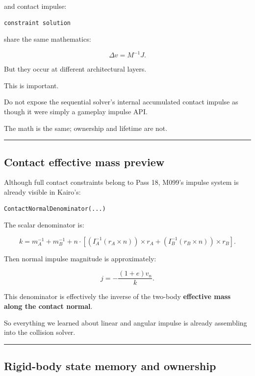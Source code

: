 and contact impulse:

\begin{verbatim}
constraint solution
\end{verbatim}

share the same mathematics:

\[
\Delta v=M^{-1}J.
\]

But they occur at different architectural layers.

This is important.

Do not expose the sequential solver's internal accumulated contact impulse as though it were simply a gameplay impulse API.

The math is the same; ownership and lifetime are not.

\begin{center}\rule{0.5\linewidth}{0.5pt}\end{center}

\subsection{Contact effective mass preview}\label{06-engine-ii-ch037-contact-effective-mass-preview}

\hypertarget{06-engine-ii-ch037-contact-effective-mass-preview}{}

Although full contact constraints belong to Pass 18, M099's impulse system is already visible in Kairo's:

\begin{verbatim}
ContactNormalDenominator(...)
\end{verbatim}

The scalar denominator is:

\[
k
=
m_A^{-1}
+
m_B^{-1}
+
n\cdot
\left[
(I_A^{-1}(r_A\times n))\times r_A
+
(I_B^{-1}(r_B\times n))\times r_B
\right].
\]

Then normal impulse magnitude is approximately:

\[
\boxed{
j
=
-\frac{
(1+e)v_n
}{
k
}.
}
\]

This denominator is effectively the inverse of the two-body \textbf{effective mass along the contact normal}.

So everything we learned about linear and angular impulse is already assembling into the collision solver.

\begin{center}\rule{0.5\linewidth}{0.5pt}\end{center}

\subsection{Rigid-body state memory and ownership}\label{06-engine-ii-ch037-rigid-body-state-memory-and-ownership}

